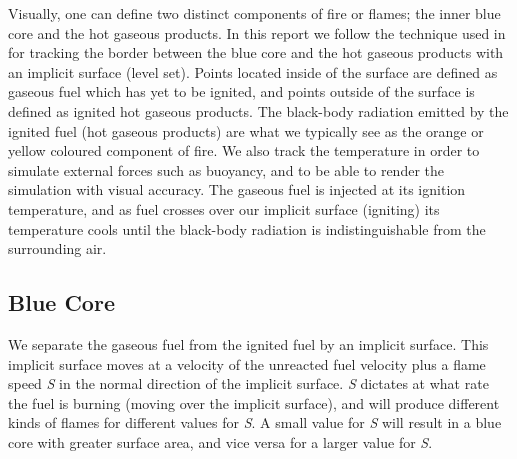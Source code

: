Visually, one can define two distinct components of fire or flames; the inner blue core and the hot gaseous products. In this report we follow the technique used in \cite{Nguyen02} for tracking the border between the blue core and the hot gaseous products with an implicit surface (level set). Points located inside of the surface are defined as gaseous fuel which has yet to be ignited, and points outside of the surface is defined as ignited hot gaseous products. The black-body radiation emitted by the ignited fuel (hot gaseous products) are what we typically see as the orange or yellow coloured component of fire. We also track the temperature in order to simulate external forces such as buoyancy, and to be able to render the simulation with visual accuracy. The gaseous fuel is injected at its ignition temperature, and as fuel crosses over our implicit surface (igniting) its temperature cools until the black-body radiation is indistinguishable from the surrounding air.
\subsection{Blue Core}
We separate the gaseous fuel from the ignited fuel by an implicit surface. This implicit surface moves at a velocity of the unreacted fuel velocity plus a flame speed \emph{S} in the normal direction of the implicit surface. \emph{S} dictates at what rate the fuel is burning (moving over the implicit surface), and will produce different kinds of flames for different values for \emph{S}. A small value for \emph{S} will result in a blue core with greater surface area, and vice versa for a larger value for \emph{S}.
